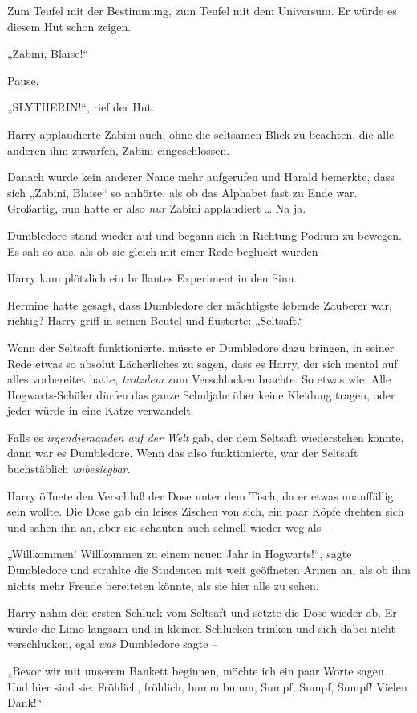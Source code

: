Zum Teufel mit der Bestimmung, zum Teufel mit dem Universum. Er würde es diesem Hut schon zeigen.

„Zabini, Blaise!“

Pause.

„SLYTHERIN!“, rief der Hut.

Harry applaudierte Zabini auch, ohne die seltsamen Blick zu beachten, die alle anderen ihm zuwarfen, Zabini eingeschlossen.

Danach wurde kein anderer Name mehr aufgerufen und Harald bemerkte, dass sich „Zabini, Blaise“ so anhörte, als ob das Alphabet fast zu Ende war. Großartig, nun hatte er also \emph{nur} Zabini applaudiert … Na ja.

Dumbledore stand wieder auf und begann sich in Richtung Podium zu bewegen. Es sah so aus, als ob sie gleich mit einer Rede beglückt würden –

Harry kam plötzlich ein brillantes Experiment in den Sinn.

Hermine hatte gesagt, dass Dumbledore der mächtigste lebende Zauberer war, richtig?
Harry griff in seinen Beutel und flüsterte: „Seltsaft.“

Wenn der Seltsaft funktionierte, müsste er Dumbledore dazu bringen, in seiner Rede etwas so absolut Lächerliches zu sagen, dass es Harry, der sich mental auf alles vorbereitet hatte, \emph{trotzdem} zum Verschlucken brachte. So etwas wie: Alle Hogwarts-Schüler dürfen das ganze Schuljahr über keine Kleidung tragen, oder jeder würde in eine Katze verwandelt.

Falls es \emph{irgendjemanden auf der Welt} gab, der dem Seltsaft wiederstehen könnte, dann war es Dumbledore. Wenn das also funktionierte, war der Seltsaft buchstäblich \emph{unbesiegbar.}

Harry öffnete den Verschluß der Dose unter dem Tisch, da er etwas unauffällig sein wollte. Die Dose gab ein leises Zischen von sich, ein paar Köpfe drehten sich und sahen ihn an, aber sie schauten auch schnell wieder weg als –

„Willkommen! Willkommen zu einem neuen Jahr in Hogwarts!“, sagte Dumbledore und strahlte die Studenten mit weit geöffneten Armen an, als ob ihm nichts mehr Freude bereiteten könnte, als sie hier alle zu sehen.

Harry nahm den ersten Schluck vom Seltsaft und setzte die Dose wieder ab. Er würde die Limo langsam und in kleinen Schlucken trinken und sich dabei nicht verschlucken, egal \emph{was} Dumbledore sagte –

„Bevor wir mit unserem Bankett beginnen, möchte ich ein paar Worte sagen. Und hier sind sie: Fröhlich, fröhlich, bumm bumm, Sumpf, Sumpf, Sumpf! Vielen Dank!“

